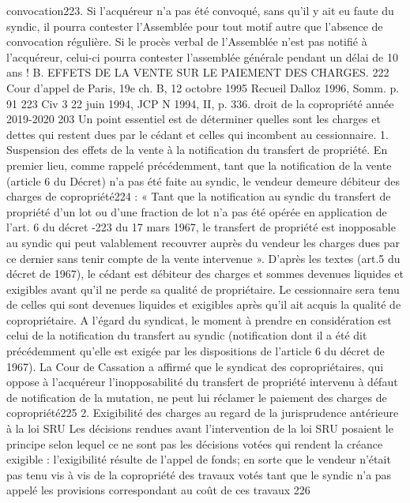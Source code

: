 	convocation223.
	Si l'acquéreur n'a pas été convoqué, sans qu'il y ait eu faute du syndic, il pourra contester l'Assemblée pour
	tout motif autre que l'absence de convocation régulière.
	Si le procès verbal de l’Assemblée n’est pas notifié à l’acquéreur, celui-ci pourra contester l’assemblée
	générale pendant un délai de 10 ans !
	B. EFFETS DE LA VENTE SUR LE PAIEMENT DES CHARGES.
	222 Cour d'appel de Paris, 19e ch. B, 12 octobre 1995 Recueil Dalloz 1996, Somm. p. 91
	223 Civ 3\ieme{} 22 juin 1994, JCP N 1994, II, p. 336.
	droit de la copropriété année 2019-2020
	203
	Un point essentiel est de déterminer quelles sont les charges et dettes qui restent dues par le cédant et
	celles qui incombent au cessionnaire.
	1. Suspension des effets de la vente à la notification du transfert de propriété.
	En premier lieu, comme rappelé précédemment, tant que la notification de la vente (article 6 du Décret)
	n’a pas été faite au syndic, le vendeur demeure débiteur des charges de copropriété224 :
	« Tant que la notification au syndic du transfert de propriété d'un lot ou d'une fraction de lot n'a pas été
	opérée en application de l'art. 6 du décret -223 du 17 mars 1967, le transfert de propriété est
	inopposable au syndic qui peut valablement recouvrer auprès du vendeur les charges dues par ce dernier
	sans tenir compte de la vente intervenue ».
	D'après les textes (art.5 du décret de 1967), le cédant est débiteur des charges et sommes devenues
	liquides et exigibles avant qu'il ne perde sa qualité de propriétaire. Le cessionnaire sera tenu de celles qui
	sont devenues liquides et exigibles après qu'il ait acquis la qualité de copropriétaire.
	A l'égard du syndicat, le moment à prendre en considération est celui de la notification du transfert au
	syndic (notification dont il a été dit précédemment qu’elle est exigée par les dispositions de l’article 6 du
	décret de 1967).
	La Cour de Cassation a affirmé que le syndicat des copropriétaires, qui oppose à l'acquéreur
	l'inopposabilité du transfert de propriété intervenu à défaut de notification de la mutation, ne peut lui
	réclamer le paiement des charges de copropriété225
	2. Exigibilité des charges au regard de la jurisprudence antérieure à la loi SRU
	Les décisions rendues avant l’intervention de la loi SRU posaient le principe selon lequel ce ne sont pas les
	décisions votées qui rendent la créance exigible : l’exigibilité résulte de l’appel de fonds; en sorte que le
	vendeur n’était pas tenu vis à vis de la copropriété des travaux votés tant que le syndic n’a pas appelé les
	provisions correspondant au coût de ces travaux 226
